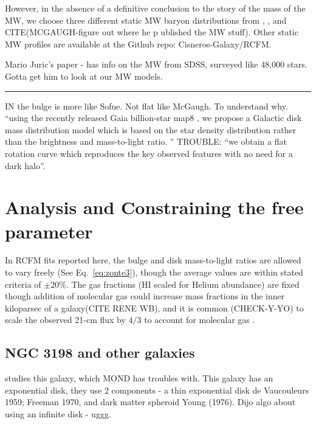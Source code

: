 \documentclass[reprint,%
 amsmath,amssymb,
 aps,
]{revtex4-1}
\begin{document}
However, in the absence of a definitive conclusion to the story of the mass of the MW, we choose three different static MW baryon distributions from \cite{Xue}, \cite{Sofue}, and CITE(MCGAUGH-figure out where he p ublished the MW stuff). 
Other static MW profiles are available at the Github repo: Cisneros-Galaxy/RCFM. 

\cite{2008ApJ...673..864J} Mario Juric's paper - has info  on the MW from SDSS, surveyed like 48,000 stars. Gotta get him to look at our MW models. 

{\color{red}  }
{\color{red} \rule{\linewidth}{0.5mm}}

 

IN \cite{Li2016ModellingMD} the bulge is more like Sofue. Not flat like McGaugh. 
To understand why. 
``using the recently released Gaia billion-star map8
, we propose a
Galactic disk mass distribution model which is based on the star density distribution
rather than the brightness and mass-to-light ratio. ''
TROUBLE: ``we obtain a flat rotation curve
which reproduces the key observed features with no need for a dark halo''.

 
  
 
\section{Analysis and Constraining the free parameter \label{sec:analysis}}


In RCFM fits reported here, the    bulge and disk mass-to-light ratios are allowed to vary freely (See Eq.~\ref{eq:zonte3}), though the average values are within stated criteria   \cite{2016Lelli} of $\pm 20\%$. The gas fractions (HI scaled for Helium abundance) are fixed though addition of molecular gas could increase mass fractions in the inner kiloparsec of a galaxy(CITE RENE WB), and it is common (CHECK-Y-YO) to scale the observed 21-cm flux by $4/3$ to account for molecular gas \cite{2004ApJ...609..652M}.


\subsection{NGC 3198 and other galaxies}
\cite{1985ApJAlbada} studies this galaxy, which MOND has troubles with. This galaxy has an exponential disk, they use 2 components -  a thin exponential disk de Vaucouleurs 1959;
Freeman 1970, and dark matter spheroid Young (1976). Dijo algo about using an infinite disk - uggg. 
 
\end{document}

